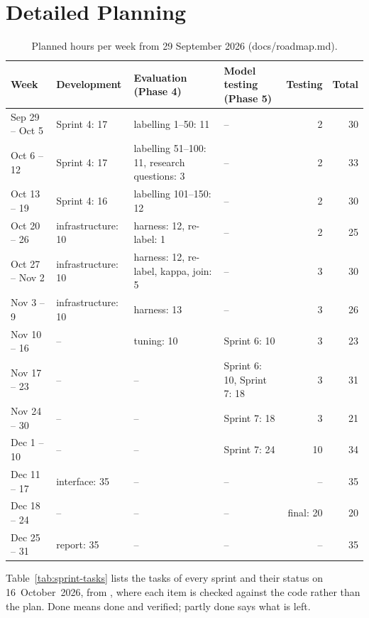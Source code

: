 
\chapter{Detailed Planning}
\label{app:planning}

\begin{table}[H]
\centering
\scriptsize
\caption{Planned hours per week from 29 September 2026
(docs/roadmap.md).}
\label{tab:weekly-hours}
\begin{tabularx}{\linewidth}{@{}lXXlrr@{}}
\toprule
Week & Development & Evaluation (Phase 4) & Model testing (Phase 5)
     & Testing & Total \\
\midrule
Sep 29 -- Oct 5 & Sprint 4: 17 & labelling 1--50: 11 & -- & 2 & 30 \\
Oct 6 -- 12     & Sprint 4: 17 & labelling 51--100: 11, research questions: 3 & -- & 2 & 33 \\
Oct 13 -- 19    & Sprint 4: 16 & labelling 101--150: 12 & -- & 2 & 30 \\
Oct 20 -- 26    & infrastructure: 10 & harness: 12, re-label: 1 & -- & 2 & 25 \\
Oct 27 -- Nov 2 & infrastructure: 10 & harness: 12, re-label, kappa, join: 5 & -- & 3 & 30 \\
Nov 3 -- 9      & infrastructure: 10 & harness: 13 & -- & 3 & 26 \\
Nov 10 -- 16    & -- & tuning: 10 & Sprint 6: 10 & 3 & 23 \\
Nov 17 -- 23    & -- & -- & Sprint 6: 10, Sprint 7: 18 & 3 & 31 \\
Nov 24 -- 30    & -- & -- & Sprint 7: 18 & 3 & 21 \\
Dec 1 -- 10     & -- & -- & Sprint 7: 24 & 10 & 34 \\
Dec 11 -- 17    & interface: 35 & -- & -- & -- & 35 \\
Dec 18 -- 24    & -- & -- & -- & final: 20 & 20 \\
Dec 25 -- 31    & report: 35 & -- & -- & -- & 35 \\
\bottomrule
\end{tabularx}
\end{table}

Table~\ref{tab:sprint-tasks} lists the tasks of every sprint and their
status on 16~October~2026, from , where each item
is checked against the code rather than the plan. Done means done and
verified; partly done says what is left.

